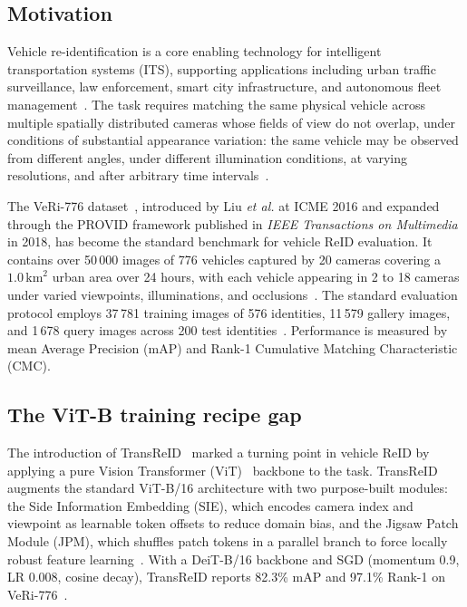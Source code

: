 \documentclass[10pt,a4paper]{article}
\begin{document}
\subsection{Motivation}
Vehicle re-identification is a core enabling technology for intelligent
transportation systems (ITS), supporting applications including urban traffic
surveillance, law enforcement, smart city infrastructure, and autonomous fleet
management~\cite{liu2016veri,liu2018provid}. The task requires matching the
same physical vehicle across multiple spatially distributed cameras whose
fields of view do not overlap, under conditions of substantial appearance
variation: the same vehicle may be observed from different angles, under
different illumination conditions, at varying resolutions, and after arbitrary
time intervals~\cite{liu2016veri}.

The VeRi-776 dataset~\cite{liu2016veri,liu2018provid}, introduced by Liu
\emph{et al.} at ICME 2016 and expanded through the PROVID framework published
in \emph{IEEE Transactions on Multimedia} in 2018, has become the standard
benchmark for vehicle ReID evaluation. It contains over 50\,000 images of 776
vehicles captured by 20 cameras covering a $1.0\,\text{km}^{2}$ urban area over
24 hours, with each vehicle appearing in 2 to 18 cameras under varied
viewpoints, illuminations, and occlusions~\cite{liu2016veri,liu2018provid}. The
standard evaluation protocol employs 37\,781 training images of 576
identities, 11\,579 gallery images, and 1\,678 query images across 200 test
identities~\cite{liu2018provid}. Performance is measured by mean Average
Precision (mAP) and Rank-1 Cumulative Matching Characteristic (CMC).

\subsection{The ViT-B training recipe gap}
The introduction of TransReID~\cite{he2021transreid} marked a turning point in
vehicle ReID by applying a pure Vision Transformer
(ViT)~\cite{dosovitskiy2021vit} backbone to the task. TransReID augments the
standard ViT-B/16 architecture with two purpose-built modules: the Side
Information Embedding (SIE), which encodes camera index and viewpoint as
learnable token offsets to reduce domain bias, and the Jigsaw Patch Module
(JPM), which shuffles patch tokens in a parallel branch to force locally robust
feature learning~\cite{he2021transreid}. With a DeiT-B/16 backbone and SGD
(momentum 0.9, LR 0.008, cosine decay), TransReID reports 82.3\% mAP and 97.1\%
Rank-1 on VeRi-776~\cite{he2021transreid}.
\end{document}
